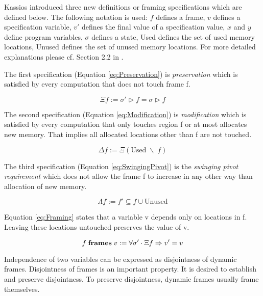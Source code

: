 Kassios introduced three new definitions or framing specifications which are defined below. The following notation is used: $f$ defines a frame, $v$ defines a specification variable, $v'$ defines the final value of a specification value, $x$ and $y$ define program variables, $\sigma$ defines a state, Used defines the set of used memory locations, Unused defines the set of unused memory locations. For more detailed explanations please cf. Section 2.2 in \cite{Kassios06Dynamic}.

The first specification (Equation \ref{eq:Preservation}) is \emph{preservation} which is satisfied by every computation that does not touch frame f.

\begin{equation}
	\Xi f := \sigma' \triangleright f = \sigma \triangleright f
	\label{eq:Preservation}
\end{equation}

The second specification (Equation \ref{eq:Modification}) is \emph{modification} which is satisfied by every computation that only touches region f or at most allocates new memory. That implies all allocated locations other than f are not touched.

\begin{equation}
	\Delta f := \Xi (\text{Used} \; \backslash \; f)
	\label{eq:Modification}
\end{equation}

The third specification (Equation \ref{eq:SwingingPivot}) is the \emph{swinging pivot requirement} which does not allow the frame f to increase in any other way than allocation of new memory.

\begin{equation}
	\Lambda f := f' \subseteq f \cup \text{Unused}
	\label{eq:SwingingPivot}
\end{equation}

Equation \ref{eq:Framing} states that a variable v depends only on locations in f. Leaving these locations untouched preserves the value of v.

\begin{equation}
	f \; \text{\bf{frames}} \; v := \forall \sigma' \cdot \Xi f \Rightarrow v' = v
	\label{eq:Framing}
\end{equation}

Independence of two variables can be expressed as disjointness of dynamic frames. Disjointness of frames is an important property. It is desired to establish and preserve disjointness. To preserve disjointness, dynamic frames usually frame themselves.

